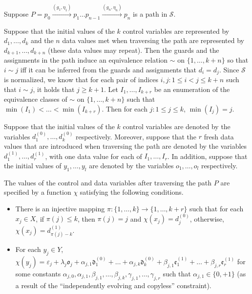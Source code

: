 \documentclass[runningheads,a4paper]{llncs}
\def\Ss{{\mathcal{S} }}
\newcommand{\vard}{\mathfrak{d}}
\newcommand{\vare}{\mathfrak{e}}
\newcommand{\varo}{\mathfrak{o}}
\newcommand{\csta}{\alpha}
\newcommand{\cstb}{\beta}
\newcommand{\cste}{\varepsilon}
\newcommand{\cstl}{\lambda}
\begin{document}
Suppose $P=p_0 \xrightarrow{(g_1,\eta_1)} p_1 \dots p_{n-1} \xrightarrow{(g_n,\eta_n)} p_{n}$ is a path in $\Ss$. 

Suppose that the initial values of the $k$ control variables are represented by $d_1,\dots, d_k$ and the $n$ data values met when traversing the path are represented by $d_{k+1},\dots,d_{k+n}$ (these data values may repeat). Then the guards and the assignments in the path induce an equivalence relation $\sim$ on $\{1,\dots, k+n\}$ so that  $i \sim j$ iff it can be inferred from the guards and assignments that $d_i = d_j$. Since $\Ss$ is normalized, we know that for each pair of indices $i,j: 1 \le i < j \le k+n$ such that $i \sim j$, it holds that $j \ge k+1$. Let $I_1,\dots, I_{k+r}$ be an enumeration of the equivalence classes of $\sim$ on $\{1,\dots, k+n\}$ such that $\min(I_1) < \dots < \min(I_{k+r})$. Then for each $j: 1 \le j \le k$, $\min(I_j)=j$.

Suppose that the initial values of the $k$ control variables are denoted by the variables $d^{(0)}_1,\dots,d^{(0)}_k$ respectively. Moreover, suppose that the $r$ fresh data values that are introduced when traversing the path are denoted by the variables $d^{(1)}_{1},\dots,d^{(1)}_{r}$, with one data value for each of $I_{1},\dots,I_{r}$. 
In addition, suppose that the initial values of $y_1,\dots, y_l$ are denoted by the variables $o_1,\dots,o_l$ respectively. 

\begin{proposition}\label{prop-sum-path}
The values of the control and data variables after traversing the path $P$ are specified by a function $\chi$ satisfying the following conditions.
\begin{itemize}
\item There is an injective mapping $\pi: \{1,\dots,k\} \rightarrow \{1,\dots, k+r\}$ such that for each $x_j \in X$, if $\pi(j) \le k$, then $\pi(j)=j$ and $\chi(x_j)=d^{(0)}_{j}$, otherwise, $\chi(x_j)=d^{(1)}_{\pi(j)-k}$.
% 
\item For each $y_j \in Y$, $\chi(y_j) = \cste_{j} + \cstl_j \varo_j + \csta_{j,1} \vard^{(0)}_1 + \dots + \csta_{j,k} \vard^{(0)}_k + \cstb_{j,1} \vare^{(1)}_1 +\dots + \cstb_{j,r} \vare^{(1)}_{r}$ for some constants $\alpha_{j,0},\alpha_{j,1}, \beta_{j,1},\dots,\beta_{j,k}, \gamma_{j,1},\dots,\gamma_{j,r}$ such that $\alpha_{j,1} \in \{0,+1\}$ (as a result of the ``independently evolving and copyless'' constraint).
\end{itemize}
\end{proposition}
\end{document}
